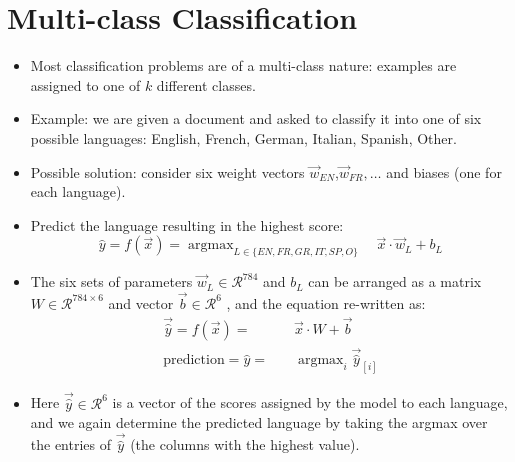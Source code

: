 \section{Multi-class Classification}
\begin{itemize}
\item Most classification problems are of a multi-class nature: examples are assigned to one of $k$ different classes.
\item Example: we are given a document and asked to classify it into one of six possible languages: English, French, German, Italian, Spanish, Other.
\item Possible solution: consider six weight vectors $\vec{w}_{EN}$,$\vec{w}_{FR},\dots$ and biases (one for each language).
\item Predict the language resulting in the highest score:
\begin{equation}
 \hat{y} = f(\vec{x}) = \operatorname{argmax}_{L \in \{ EN,FR,GR,IT,SP,O \}} \quad \vec{x}\cdot \vec{w}_L+ b_{L}
\end{equation}
\item The six sets of parameters $\vec{w}_L \in  \mathcal{R}^{784}$ and $b_L$  can be arranged as a matrix $W \in \mathcal{R}^{784\times6}$ and vector $\vec{b} \in \mathcal{R}^6$ , and the equation re-written as:
\begin{equation}
 \begin{split}
  \vec{\hat{y}} = f(\vec{x}) = \quad & \vec{x} \cdot W + \vec{b}\\
   \text{prediction} = \hat{y} = \quad  & \operatorname{argmax}_i \vec{\hat{y}}_{[i]} 
 \end{split}
\end{equation}

\item Here $\vec{\hat{y}} \in \mathcal{R}^6$ is a vector of the scores assigned by the model to each language, and we again determine the predicted language by taking the argmax over the entries of $\vec{\hat{y}}$ (the columns with the highest value).

\end{itemize}

